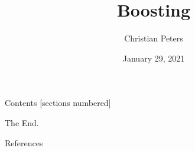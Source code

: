 \documentclass[10pt]{beamer}
\title{Boosting}
\date{January 29, 2021}
\author{Christian Peters}
\begin{document}
\maketitle

\begin{frame}{Contents}
  [sections numbered]
  \tableofcontents
\end{frame}




	




\begin{frame}[standout]
  The End.
\end{frame}

\appendix

\begin{frame}[allowframebreaks]{References}

  \nocite{SSBD14, FREUND1997119, kv-lbffahf-88}

  
  

\end{frame}
\end{document}
